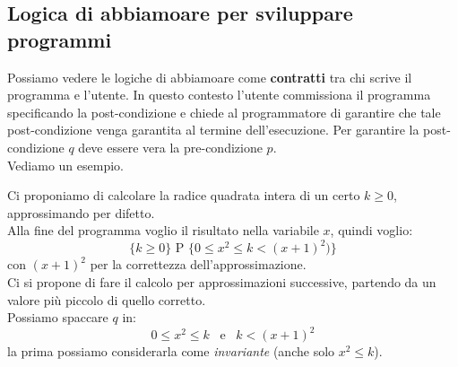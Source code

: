 				      					      			\subsection{Logica di abbiamoare per sviluppare programmi}
				      					      			Possiamo vedere le logiche di abbiamoare come \textbf{contratti} tra chi scrive il
				      					      			programma e l'utente. In questo contesto l'utente commissiona il programma
				      					      			specificando la post-condizione e chiede al programmatore di garantire che tale
				      					      			post-condizione venga garantita al termine dell'esecuzione. Per garantire la
				      					      			post-condizione $q$ deve essere vera la pre-condizione $p$.\\
				      					      			Vediamo un esempio.
				      					      			\begin{esempio}
				      					      				Ci proponiamo di calcolare la radice quadrata intera di un certo $k\geq 0$,
				      					      				approssimando per difetto.\\
				      					      				Alla fine del programma voglio il risultato nella variabile $x$, quindi
				      					      				voglio:
				      					      				\[\{k\geq 0\}\mbox{ P }\{0\leq x^2\leq k<(x+1)^2)\}\]
				      					      				con $(x+1)^2$ per la correttezza dell'approssimazione.\\
				      					      				Ci si propone di fare il calcolo per approssimazioni successive, partendo da
				      					      				un valore più piccolo di quello corretto.\\
				      					      				Possiamo spaccare $q$ in:
				      					      				\[0\leq x^2\leq k \,\,\,\mbox{ e }\,\,\, k<(x+1)^2\]
				      					      				la prima possiamo considerarla come \textit{invariante} (anche solo $x^2\leq
				      					      				k$).\\
				      					      								      					      				  

\end{esempio}

